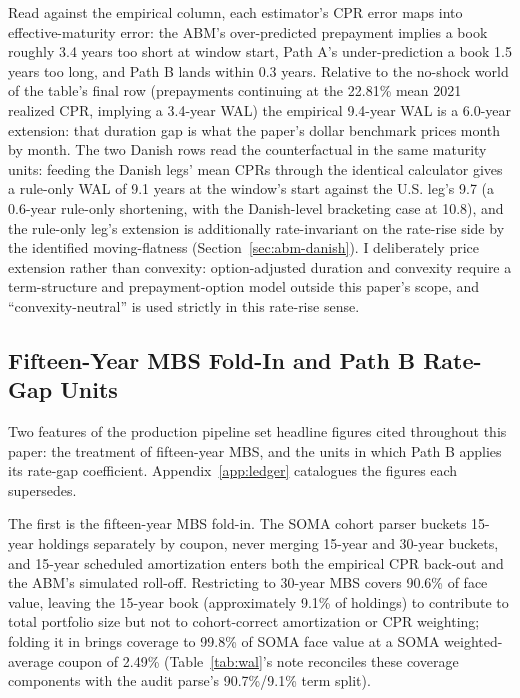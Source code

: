\documentclass[12pt]{article}
\begin{document}
Read against the empirical column, each estimator's CPR error maps into effective-maturity error: the ABM's over-predicted prepayment implies a book roughly 3.4 years too short at window start, Path A's under-prediction a book 1.5 years too long, and Path B lands within 0.3 years. Relative to the no-shock world of the table's final row (prepayments continuing at the 22.81\% mean 2021 realized CPR, implying a 3.4-year WAL) the empirical 9.4-year WAL is a 6.0-year extension: that duration gap is what the paper's dollar benchmark prices month by month. The two Danish rows read the counterfactual in the same maturity units: feeding the Danish legs' mean CPRs through the identical calculator gives a rule-only WAL of 9.1 years at the window's start against the U.S. leg's 9.7 (a 0.6-year rule-only shortening, with the Danish-level bracketing case at 10.8), and the rule-only leg's extension is additionally rate-invariant on the rate-rise side by the identified moving-flatness (Section~\ref{sec:abm-danish}). I deliberately price extension rather than convexity: option-adjusted duration and convexity require a term-structure and prepayment-option model outside this paper's scope, and ``convexity-neutral'' is used strictly in this rate-rise sense.

\subsection{Fifteen-Year MBS Fold-In and Path B Rate-Gap Units}\label{sec:robustness-pipeline}

Two features of the production pipeline set headline figures cited throughout this paper: the treatment of fifteen-year MBS, and the units in which Path B applies its rate-gap coefficient. Appendix~\ref{app:ledger} catalogues the figures each supersedes.

The first is the fifteen-year MBS fold-in. The SOMA cohort parser buckets 15-year holdings separately by coupon, never merging 15-year and 30-year buckets, and 15-year scheduled amortization enters both the empirical CPR back-out and the ABM's simulated roll-off. Restricting to 30-year MBS covers 90.6\% of face value, leaving the 15-year book (approximately 9.1\% of holdings) to contribute to total portfolio size but not to cohort-correct amortization or CPR weighting; folding it in brings coverage to 99.8\% of SOMA face value at a SOMA weighted-average coupon of 2.49\% (Table~\ref{tab:wal}'s note reconciles these coverage components with the audit parse's 90.7\%/9.1\% term split).
\end{document}
